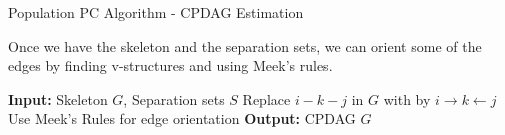 \documentclass{beamer}
\begin{document}
\begin{frame}{Population PC Algorithm - CPDAG Estimation}

Once we have the skeleton and the separation sets, we can orient some of the edges by finding v-structures and using Meek's rules.
\begin{algorithm}[H]
\footnotesize
\caption{V-Structure Orientation Algorithm}
\begin{algorithmic}[1]
\State \textbf{Input:} Skeleton $G$, Separation sets $S$
\State Replace $i - k - j$ in $G$ with by $i \rightarrow k \leftarrow j$
\EndIf
\EndFor
\State Use Meek's Rules for edge orientation
\State \textbf{Output:} CPDAG $G$
\end{algorithmic}
\end{algorithm}


\end{frame}
\end{document}
